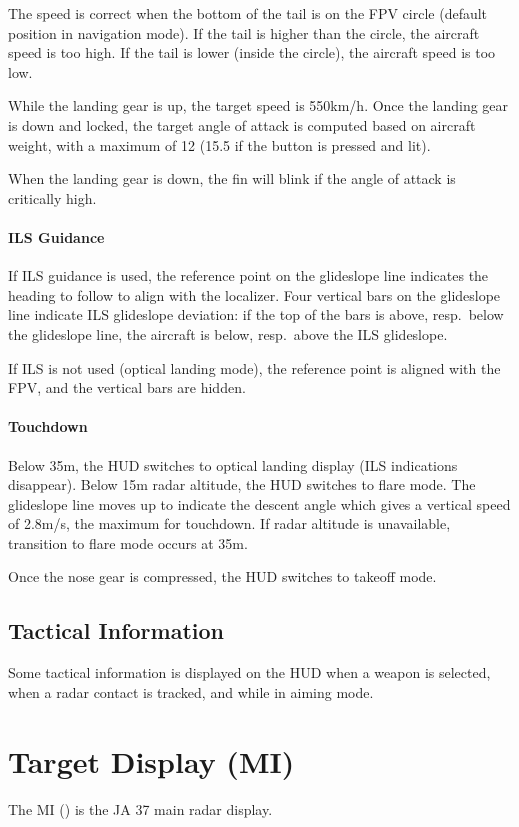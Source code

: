 The speed is correct when the bottom of the tail is on the FPV circle
(default position in navigation mode).
If the tail is higher than the circle, the aircraft speed is too high.
If the tail is lower (inside the circle), the aircraft speed is too low.

While the landing gear is up, the target speed is 550km/h.
Once the landing gear is down and locked, the target angle of attack is
computed based on aircraft weight, with a maximum of 12\textdegree{}
(15.5\textdegree{} if the button  is pressed and lit).

When the landing gear is down, the fin will blink if the angle of attack is critically high.

\paragraph{ILS Guidance}
If ILS guidance is used, the reference point on the glideslope line
indicates the heading to follow to align with the localizer.
Four vertical bars on the glideslope line indicate ILS glideslope deviation:
if the top of the bars is above, resp.\ below the glideslope line,
the aircraft is below, resp.\ above the ILS glideslope.

If ILS is not used (optical landing mode),
the reference point is aligned with the FPV, and the vertical bars are hidden.

\paragraph{Touchdown}
Below 35m, the HUD switches to optical landing display (ILS indications disappear).
Below 15m radar altitude, the HUD switches to flare mode.
The glideslope line moves up to indicate the descent angle
which gives a vertical speed of 2.8m/s, the maximum for touchdown.
If radar altitude is unavailable, transition to flare mode occurs at 35m.

Once the nose gear is compressed, the HUD switches to takeoff mode.

\subsection{Tactical Information}
Some tactical information is displayed on the HUD when a weapon is selected,
when a radar contact is tracked, and while in aiming mode.


\clearpage
\section{Target Display (MI)}
The MI () is the JA 37 main radar display.

